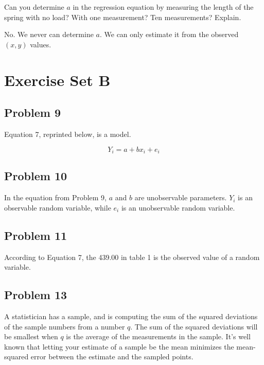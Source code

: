 \documentclass{article}
\begin{document}
Can you determine $a$ in the regression equation by measuring the length of the spring with no load? With one measurement? Ten measurements? Explain.

No. We never can determine $a$. We can only estimate it from the observed $(x, y)$ values.

\section*{Exercise Set B}

\subsection*{Problem 9}

Equation 7, reprinted below, is a model.

\[
Y_i = a + bx_i + e_i
\]

\subsection*{Problem 10}

In the equation from Problem 9, $a$ and $b$ are unobservable parameters. $Y_i$ is an observable random variable, while $e_i$ is an unobservable random variable.

\subsection*{Problem 11}

According to Equation 7, the 439.00 in table 1 is the observed value of a random variable.

\subsection*{Problem 13}

A statistician has a sample, and is computing the sum of the squared deviations of the sample numbers from a number $q$. The sum of the squared deviations will be smallest when $q$ is the average of the measurements in the sample. It's well known that letting your estimate of a sample be the mean minimizes the mean-squared error between the estimate and the sampled points.
\end{document}
